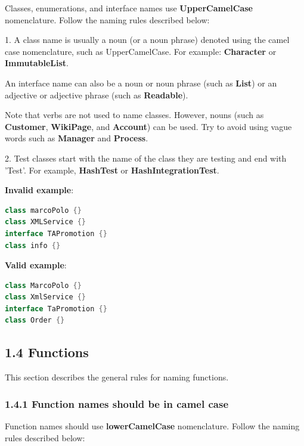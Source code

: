 {{{{\label{sec:1.3.1}

Classes, enumerations, and interface names use \textbf{UpperCamelCase} nomenclature. Follow the naming rules described below:

1.	A class name is usually a noun (or a noun phrase) denoted using the camel case nomenclature, such as UpperCamelCase. For example: \textbf{Character} or \textbf{ImmutableList}.

An interface name can also be a noun or noun phrase (such as \textbf{List}) or an adjective or adjective phrase (such as \textbf{Readable}).

Note that verbs are not used to name classes. However, nouns (such as \textbf{Customer}, \textbf{WikiPage}, and \textbf{Account}) can be used. Try to avoid using vague words such as \textbf{Manager} and \textbf{Process}.



2.	Test classes start with the name of the class they are testing and end with 'Test'. For example, \textbf{HashTest} or \textbf{HashIntegrationTest}.



\textbf{Invalid example}: 

\begin{lstlisting}[language=Kotlin]
class marcoPolo {} 
class XMLService {} 
interface TAPromotion {}
class info {}
\end{lstlisting}


\textbf{Valid example}: 

\begin{lstlisting}[language=Kotlin]
class MarcoPolo {}
class XmlService {}
interface TaPromotion {}
class Order {}
\end{lstlisting}


\subsection*{\textbf{1.4 Functions}}

\label{sec:1.4}

This section describes the general rules for naming functions.

\subsubsection*{\textbf{1.4.1 Function names should be in camel case}}
\leavevmode\newline

\label{sec:1.4.1}

Function names should use \textbf{lowerCamelCase} nomenclature. Follow the naming rules described below:

}}}}
